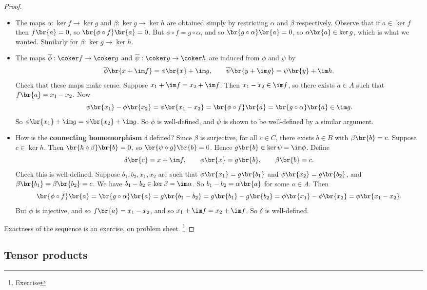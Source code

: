 \begin{proof}
\hfill
\begin{itemize}
\item The maps $ \alpha : \ker f \to \ker g $ and $ \beta : \ker g \to \ker h $ are obtained simply by restricting $ \alpha $ and $ \beta $ respectively. Observe that if $ a \in \ker f $ then $ f\br{a} = 0 $, so $ \br{\phi \circ f}\br{a} = 0 $. But $ \phi \circ f = g \circ \alpha $, and so $ \br{g \circ \alpha}\br{a} = 0 $, so $ \alpha\br{a} \in \ker g $, which is what we wanted. Similarly for $ \beta : \ker g \to \ker h $.
\item The maps $ \overline{\phi} : \coker f \to \coker g $ and $ \overline{\psi} : \coker g \to \coker h $ are induced from $ \phi $ and $ \psi $ by
$$ \overline{\phi}\br{x + \im f} = \phi\br{x} + \im g, \qquad \overline{\psi}\br{y + \im g} = \psi\br{y} + \im h. $$
Check that these maps make sense. Suppose $ x_1 + \im f = x_2 + \im f $. Then $ x_1 - x_2 \in \im f $, so there exists $ a \in A $ such that $ f\br{a} = x_1 - x_2 $. Now
$$ \phi\br{x_1} - \phi\br{x_2} = \phi\br{x_1 - x_2} = \br{\phi \circ f}\br{a} = \br{g \circ \alpha}\br{a} \in \im g. $$
So $ \phi\br{x_1} + \im g = \phi\br{x_2} + \im g $. So $ \overline{\phi} $ is well-defined, and $ \overline{\psi} $ is shown to be well-defined by a similar argument.
\item How is the \textbf{connecting homomorphism} $ \delta $ defined? Since $ \beta $ is surjective, for all $ c \in C $, there exists $ b \in B $ with $ \beta\br{b} = c $. Suppose $ c \in \ker h $. Then $ \br{h \circ \beta}\br{b} = 0 $, so $ \br{\psi \circ g}\br{b} = 0 $. Hence $ g\br{b} \in \ker \psi = \im \phi $. Define
$$ \delta\br{c} = x + \im f, \qquad \phi\br{x} = g\br{b}, \qquad \beta\br{b} = c. $$
Check this is well-defined. Suppose $ b_1, b_2, x_1, x_2 $ are such that $ \phi\br{x_1} = g\br{b_1} $ and $ \phi\br{x_2} = g\br{b_2} $, and $ \beta\br{b_1} = \beta\br{b_2} = c $. We have $ b_1 - b_2 \in \ker \beta = \im \alpha $. So $ b_1 - b_2 = \alpha\br{a} $ for some $ a \in A $. Then
$$ \br{\phi \circ f}\br{a} = \br{g \circ \alpha}\br{a} = g\br{b_1 - b_2} = g\br{b_1} - g\br{b_2} = \phi\br{x_1} - \phi\br{x_2} = \phi\br{x_1 - x_2}. $$
But $ \phi $ is injective, and so $ f\br{a} = x_1 - x_2 $, and so $ x_1 + \im f = x_2 + \im f $. So $ \delta $ is well-defined.
\end{itemize}
Exactness of the sequence is an exercise, on problem sheet. \footnote{Exercise}
\end{proof}

\subsection{Tensor products}

